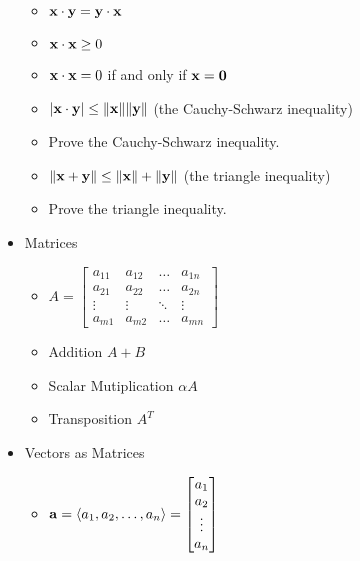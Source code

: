 \documentclass[11pt]{article}
\begin{document}
\begin{itemize}
\begin{itemize}
      \item
        \(
          \mathbf{x}\cdot\mathbf{y}
            =
          \mathbf{y}\cdot\mathbf{x}
        \)
      \item
        \(
          \mathbf{x}\cdot\mathbf{x} \geq 0
        \)
      \item
        \(
          \mathbf{x}\cdot\mathbf{x} = 0
        \)
        if and only if
        \(
          \mathbf{x}=\mathbf{0}
        \)
      \item
        \(
          |\mathbf{x}\cdot\mathbf{y}|
            \leq
          \|\mathbf{x}\|\|\mathbf{y}\|
        \)
        (the Cauchy-Schwarz inequality)
      \item Prove the Cauchy-Schwarz inequality.
      \item
        \(
          \|\mathbf{x}+\mathbf{y}\|
            \leq
          \|\mathbf{x}\|+\|\mathbf{y}\|
        \)
        (the triangle inequality)
      \item Prove the triangle inequality.
    \end{itemize}
  \item Matrices
    \begin{itemize}
      \item
        \(
          A
            =
          \begin{bmatrix}
            a_{11} & a_{12} & \dots  & a_{1n} \\
            a_{21} & a_{22} & \dots  & a_{2n} \\
            \vdots & \vdots & \ddots & \vdots \\
            a_{m1} & a_{m2} & \dots  & a_{mn}
          \end{bmatrix}
        \)
      \item Addition \(A+B\)
      \item Scalar Mutiplication \(\alpha A\)
      \item Transposition \(A^T\)
    \end{itemize}
  \item Vectors as Matrices
    \begin{itemize}
      \item
        \(
          \mathbf{a}=\langle a_1,a_2,\dots,a_n\rangle
            =
          \begin{bmatrix}
            a_{1}  \\
            a_{2}  \\
            \vdots \\
            a_{n}
          \end{bmatrix}
        \)

\end{itemize}
\end{itemize}
\end{document}
